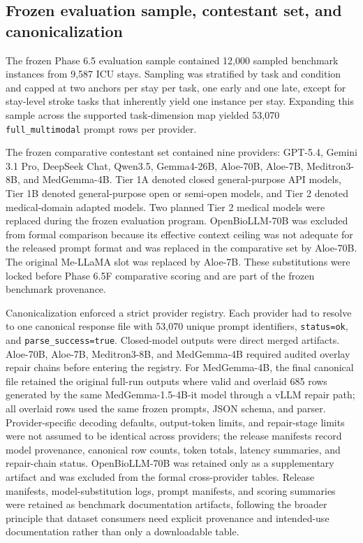 \documentclass[pdflatex,sn-nature]{sn-jnl}
\begin{document}
\subsection{Frozen evaluation sample, contestant set, and canonicalization}

The frozen Phase 6.5 evaluation sample contained 12,000 sampled benchmark instances from 9,587 ICU stays. Sampling was stratified by task and condition and capped at two anchors per stay per task, one early and one late, except for stay-level stroke tasks that inherently yield one instance per stay. Expanding this sample across the supported task-dimension map yielded 53,070 \texttt{full\_multimodal} prompt rows per provider.

The frozen comparative contestant set contained nine providers: GPT-5.4, Gemini 3.1 Pro, DeepSeek Chat, Qwen3.5, Gemma4-26B, Aloe-70B, Aloe-7B, Meditron3-8B, and MedGemma-4B. Tier 1A denoted closed general-purpose API models, Tier 1B denoted general-purpose open or semi-open models, and Tier 2 denoted medical-domain adapted models. Two planned Tier 2 medical models were replaced during the frozen evaluation program. OpenBioLLM-70B was excluded from formal comparison because its effective context ceiling was not adequate for the released prompt format and was replaced in the comparative set by Aloe-70B. The original Me-LLaMA slot was replaced by Aloe-7B. These substitutions were locked before Phase 6.5F comparative scoring and are part of the frozen benchmark provenance.

Canonicalization enforced a strict provider registry. Each provider had to resolve to one canonical response file with 53,070 unique prompt identifiers, \texttt{status=ok}, and \texttt{parse\_success=true}. Closed-model outputs were direct merged artifacts. Aloe-70B, Aloe-7B, Meditron3-8B, and MedGemma-4B required audited overlay repair chains before entering the registry. For MedGemma-4B, the final canonical file retained the original full-run outputs where valid and overlaid 685 rows generated by the same MedGemma-1.5-4B-it model through a vLLM repair path; all overlaid rows used the same frozen prompts, JSON schema, and parser. Provider-specific decoding defaults, output-token limits, and repair-stage limits were not assumed to be identical across providers; the release manifests record model provenance, canonical row counts, token totals, latency summaries, and repair-chain status. OpenBioLLM-70B was retained only as a supplementary artifact and was excluded from the formal cross-provider tables. Release manifests, model-substitution logs, prompt manifests, and scoring summaries were retained as benchmark documentation artifacts, following the broader principle that dataset consumers need explicit provenance and intended-use documentation rather than only a downloadable table\cite{gebru2021datasheets}.
\end{document}
